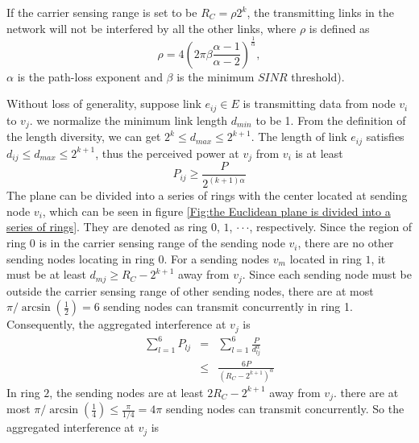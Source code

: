 \documentclass[conference]{IEEEtran}
\begin{document}
\begin{theorm}\label{theorem 2}
If the carrier sensing range is set to be $R_C=\rho 2^k$, the
transmitting links in the network will not be interfered by all the
other links, where $\rho$ is defined as
\begin{equation}\label{definition of rou}
\rho=4(2\pi \beta \frac{\alpha -1}{\alpha-2})^\frac{1}{\alpha},
\end{equation}
$\alpha$ is the path-loss exponent and $\beta$ is the minimum $SINR$
threshold).
\end{theorm}
\begin{IEEEproof}
Without loss of generality, suppose link $e_{ij}\in E$ is
transmitting data from node $v_{i}$ to $v_{j}$. we normalize the
minimum link length $d_{min}$ to be 1. From the definition of the
length diversity, we can get $2^k\leq d_{max} \leq 2^{k+1}$. The
length of link $e_{ij}$ satisfies $d_{ij}\leq{d_{max}
\leq{2^{k+1}}}$, thus the perceived power at $v_j$ from $v_i$ is at
least
\begin{equation}\label{received power}
P_{ij}\geq{\frac{P}{2^{(k+1)\alpha}}}
\end{equation}
The plane can be divided into a series of rings with the center
located at sending node $v_i$, which can be seen in figure
\ref{Fig:the Euclidean plane is divided into a series of rings}.
They are denoted as ring $0$, $1$, $\cdot\cdot\cdot$, respectively.
Since the region of ring $0$ is in the carrier sensing range of the
sending node $v_i$, there are no other sending nodes locating in
ring $0$. For a sending nodes $v_m$ located in ring $1$, it must be
at least $d_{mj}\geq R_C-2^{k+1}$ away from $v_j$. Since each
sending node must be outside the carrier sensing range of other
sending nodes, there are at most $\pi /\arcsin(\frac{1}{2})=6$
sending nodes can transmit concurrently in ring 1. Consequently, the
aggregated interference at $v_j$ is
\begin{eqnarray}\label{interference in annular area 1}
\sum_{l=1}^{6} P_{lj} &=&\sum_{l=1}^{6} \frac{P}{d_{lj}^\alpha}\nonumber \\
                      &\leq &\frac{6P}{(R_C-2^{k+1})^\alpha}\nonumber
\end{eqnarray}
In ring $2$, the sending nodes are at least $2R_C-2^{k+1}$ away from
$v_j$. there are at most $\pi /\arcsin(\frac{1}{4})\leq
\frac{\pi}{1/4}=4\pi$ sending nodes can transmit concurrently. So
the aggregated interference at $v_j$ is
\begin{displaymath} \label{interference in annular area 2}

\end{displaymath}
\end{IEEEproof}
\end{document}
